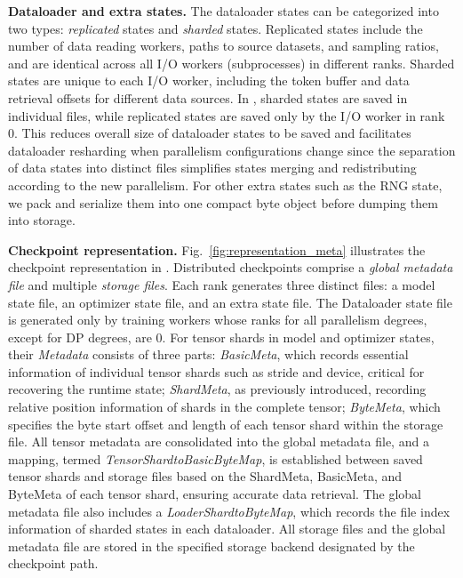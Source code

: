 \noindent \textbf{Dataloader and extra states.}
The dataloader states can be categorized into two types: \textit{replicated} states and \textit{sharded} states. Replicated states include the number of data reading workers, paths to source datasets, and sampling ratios, and are identical across all I/O workers (subprocesses) in different ranks.
Sharded states are unique to each I/O worker, including the token buffer %
and data retrieval offsets for different data sources. %
In \sys{}, %
sharded states are saved in individual files, while replicated states are saved only by the I/O worker in rank 0. This %
reduces overall %
size of dataloader states to be saved and facilitates dataloader resharding when parallelism configurations change since the separation of data states into distinct files simplifies %
states merging and redistributing according to the new parallelism. For other extra states such as the RNG state, we pack and 
serialize them into one compact byte object before dumping them into storage.

\noindent \textbf{Checkpoint representation.}
Fig.~\ref{fig:representation_meta} illustrates the checkpoint representation in \sys{}.
Distributed checkpoints comprise a \textit{global metadata file}
and multiple \textit{storage files}.
Each rank 
generates three distinct files: a model state file, an optimizer state file, and an extra state file.
The Dataloader state file is generated only by training workers whose ranks for all parallelism degrees, except for DP degrees, are 0.
For tensor shards in model and optimizer states, their \textit{Metadata} consists of three parts:
\textit{BasicMeta}, which records essential information of individual tensor shards such as stride and device, critical for recovering the runtime state;
\textit{ShardMeta}, as previously introduced, recording relative position information of shards in the complete tensor;
\textit{ByteMeta}, which specifies the byte start offset and length of each tensor shard within the storage file.
All tensor metadata are consolidated into the global metadata file, and a mapping, termed \textit{TensorShardtoBasicByteMap}, is established between saved tensor shards and storage files based on the ShardMeta, BasicMeta, and ByteMeta of each tensor shard, ensuring accurate data retrieval.
The global metadata file also includes a \textit{LoaderShardtoByteMap}, which records the file index information of sharded states in each dataloader.
All storage files and the global metadata file are
stored in the specified storage backend designated by the checkpoint path.

